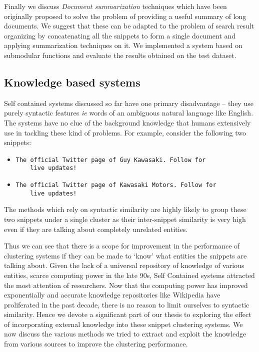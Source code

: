 \documentclass[a4paper,12pt]{report}
\begin{document}
Finally we discuss {\it Document summarization} techniques which have
been originally proposed to solve the problem of providing a useful
summary of long documents. We suggest that these can be adapted to the
problem of search result organizing by concatenating all the snippets
to form a single document and applying summarization techniques on
it. We implemented a system based on submodular functions\cite{Bilmes}
and evaluate the results obtained on the test dataset.


\subsection{Knowledge based systems}

Self contained systems discussed so far have one primary disadvantage
-- they use purely syntactic features {\it ie} words of an ambiguous
natural language like English. The systems have no clue of the
background knowledge that humans extensively use in tackling these
kind of problems. For example, consider the following two snippets:

\begin{itemize}
  \item \begin{verbatim}The official Twitter page of Guy Kawasaki. Follow for
    live updates!\end{verbatim}
  \item \begin{verbatim}The official Twitter page of Kawasaki Motors. Follow for
    live updates! \end{verbatim}
\end{itemize}

The methods which rely on syntactic similarity are highly likely to
group these two snippets under a single cluster as their inter-snippet
similarity is very high even if they are talking about completely
unrelated entities.

Thus we can see that there is a scope for improvement in the
performance of clustering systems if they can be made to `know' what
entities the snippets are talking about. Given the lack of a universal
repository of knowledge of various entities, scarce computing power in
the late 90s, Self Contained systems attracted the most attention of
researchers. Now that the computing power has improved exponentially
and accurate knowledge repositories like Wikipedia have proliferated
in the past decade, there is no reason to limit ourselves to syntactic
similarity. Hence we devote a significant part of our thesis to
exploring the effect of incorporating external knowledge into these
snippet clustering systems. We now discuss the various methods we
tried to extract and exploit the knowledge from various sources to
improve the clustering performance.
\end{document}
